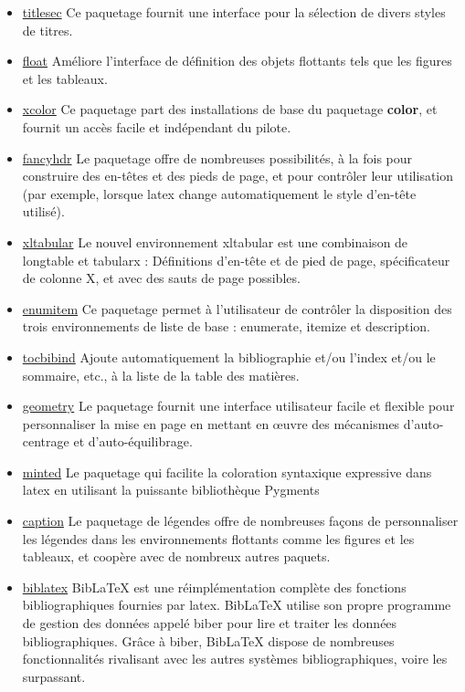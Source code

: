 \begin{itemize}
    \item \href{https://www.ctan.org/pkg/titlesec}{titlesec} Ce paquetage fournit une interface pour la sélection de
          divers styles de titres.
    \item \href{https://www.ctan.org/pkg/float}{float} Améliore l'interface de définition des objets flottants
          tels que les figures et les tableaux.
    \item \href{https://www.ctan.org/pkg/xcolor}{xcolor} Ce paquetage part des installations de base
          du paquetage \textbf{color}, et fournit un accès facile et indépendant du pilote.
    \item \href{https://www.ctan.org/pkg/fancyhdr}{fancyhdr} Le paquetage offre de nombreuses possibilités,
          à la fois pour construire des en-têtes et des pieds de page, et pour contrôler leur
          utilisation (par exemple, lorsque \gls{latex} change automatiquement le style d'en-tête utilisé).
    \item \href{https://www.ctan.org/pkg/xltabular}{xltabular} Le nouvel environnement xltabular est une combinaison
          de longtable et tabularx : Définitions d'en-tête et de pied de page, spécificateur de colonne X,
          et avec des sauts de page possibles.
    \item \href{https://www.ctan.org/pkg/enumitem}{enumitem} Ce paquetage permet à l'utilisateur de contrôler
          la disposition des trois environnements de liste de base : enumerate, itemize et description.
    \item \href{https://www.ctan.org/pkg/tocbibind}{tocbibind} Ajoute automatiquement la bibliographie et/ou
          l'index et/ou le sommaire, etc., à la liste de la table des matières.
    \item \href{https://www.ctan.org/pkg/geometry}{geometry} Le paquetage fournit une interface
          utilisateur facile et flexible pour personnaliser la mise en page en mettant en œuvre des mécanismes
          d'auto-centrage et d'auto-équilibrage.
    \item \href{https://www.ctan.org/pkg/minted}{minted} Le paquetage qui facilite la coloration syntaxique expressive dans
          \gls{latex} en utilisant la puissante bibliothèque Pygments
    \item \href{https://www.ctan.org/pkg/caption}{caption} Le paquetage de légendes offre de nombreuses façons de
          personnaliser les légendes dans les environnements flottants comme les figures et les tableaux, et coopère
          avec de nombreux autres paquets.
    \item \href{https://www.ctan.org/pkg/biblatex}{biblatex} BibLaTeX est une réimplémentation complète des fonctions
          bibliographiques fournies par \gls{latex}. BibLaTeX utilise son propre programme de gestion des données appelé biber
          pour lire et traiter les données bibliographiques. Grâce à biber, BibLaTeX dispose de nombreuses fonctionnalités
          rivalisant avec les autres systèmes bibliographiques, voire les surpassant.
\end{itemize}

